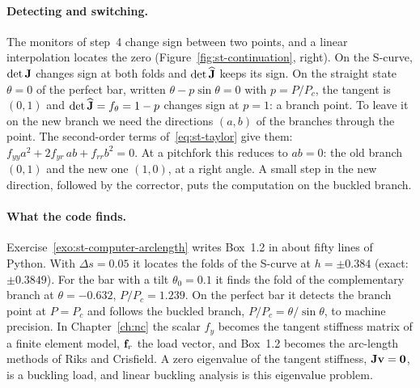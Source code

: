 \paragraph{Detecting and switching.}
%
The monitors of step~4 change sign between two points, and a linear interpolation
locates the zero (Figure~\ref{fig:st-continuation}, right). On the S-curve,
$\det\mathbf{J}$ changes sign at both folds and $\det\widehat{\mathbf{J}}$ keeps its sign. On
the straight state $\theta = 0$ of the perfect bar, written $\theta - p\sin\theta = 0$
with $p = P/P_c$, the tangent is $(0,1)$ and $\det\widehat{\mathbf{J}} = f_\theta = 1 - p$
changes sign at $p = 1$: a branch point. To leave it on the new branch we need the
directions $(a,b)$ of the branches through the point. The second-order terms
of~\eqref{eq:st-taylor} give them:
$f_{yy}a^2 + 2f_{yr}\,ab + f_{rr}b^2 = 0$. At a pitchfork this reduces to $ab = 0$:
the old branch $(0,1)$ and the new one $(1,0)$, at a right angle. A small step in
the new direction, followed by the corrector, puts the computation on the buckled
branch.

\paragraph{What the code finds.}
Exercise~\ref{exo:st-computer-arclength} writes Box~1.2 in about fifty lines of Python.
With $\Delta s = 0.05$ it locates the folds of the S-curve at $h = \pm0.384$
(exact: $\pm0.3849$). For the bar with a tilt $\theta_0 = 0.1$ it finds the fold
of the complementary branch at $\theta = -0.632$, $P/P_c = 1.239$. On the perfect
bar it detects the branch point at $P = P_c$ and follows the buckled branch,
$P/P_c = \theta/\sin\theta$, to machine precision. In Chapter~\ref{ch:nc} the scalar
$f_y$ becomes the tangent stiffness matrix of a finite element model, $\mathbf{f}_r$ the
load vector, and Box~1.2 becomes the arc-length methods of Riks and Crisfield. A
zero eigenvalue of the tangent stiffness, $\mathbf{J}\mathbf{v} = \mathbf{0}$, is a buckling
load, and linear buckling analysis is this eigenvalue problem.

